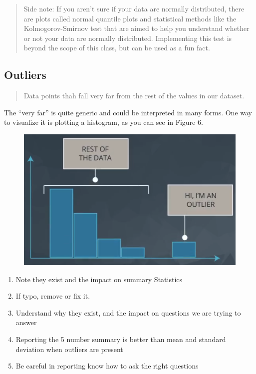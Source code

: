 \documentclass[]{book}
\providecommand{\tightlist}{%
  \setlength{\itemsep}{0pt}\setlength{\parskip}{0pt}}
\begin{document}
\begin{quote}
Side note: If you aren't sure if your data are normally distributed,
there are plots called normal quantile plots and statistical methods
like the Kolmogorov-Smirnov test that are aimed to help you understand
whether or not your data are normally distributed. Implementing this
test is beyond the scope of this class, but can be used as a fun fact.
\end{quote}

\subsection{Outliers}\label{outliers}

\begin{quote}
Data points thah fall very far from the rest of the values in our
dataset.
\end{quote}

The ``very far'' is quite generic and could be interpreted in many
forms. One way to visualize it is plotting a histogram, as you can see
in Figure 6.

\begin{figure}
\centering
\includegraphics{01-img/c4_l2_06.png}
\caption{}
\end{figure}

\begin{enumerate}
\def\labelenumi{\arabic{enumi}.}
\tightlist
\item
  Note they exist and the impact on summary Statistics
\item
  If typo, remove or fix it.
\item
  Understand why they exist, and the impact on questions we are trying
  to answer
\item
  Reporting the 5 number summary is better than mean and standard
  deviation when outliers are present
\item
  Be careful in reporting know how to ask the right questions
\end{enumerate}
\end{document}
